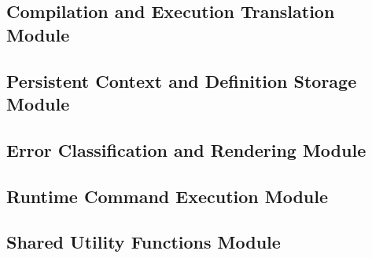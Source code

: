 \documentclass[11pt]{scrartcl}
\begin{document}
\subsection{Compilation and Execution Translation Module}

\subsection{Persistent Context and Definition Storage Module}

\subsection{Error Classification and Rendering Module}

\subsection{Runtime Command Execution Module}

\subsection{Shared Utility Functions Module}

\end{document}
